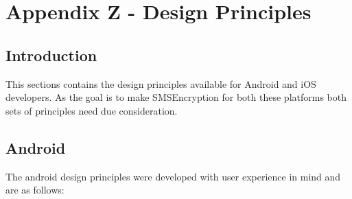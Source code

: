 \section{Appendix Z - Design Principles}

\subsection*{Introduction}
This sections contains the design principles available for Android and iOS developers. As the goal is to make SMSEncryption for both these platforms both sets of principles need due consideration.
\subsection*{Android}
The android design principles were developed with user experience in mind and are as follows:
